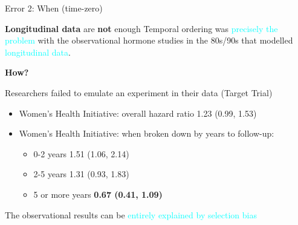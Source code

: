 \documentclass[
  ignorenonframetext,
  aspectratio=169,
]{beamer}
\providecommand{\tightlist}{%
  \setlength{\itemsep}{0pt}\setlength{\parskip}{0pt}}
\begin{document}
\begin{frame}{Error 2: When (time-zero)}
\label{error-2-when-time-zero}
\begin{block}{\textbf{Longitudinal data} are \textbf{not} enough}
\label{longitudinal-data-are-not-enough}
Temporal ordering was \textcolor{cyan}{precisely the problem} with the
observational hormone studies in the 80s/90s that modelled
\textcolor{cyan}{longitudinal data}.

\textbf{How?}
\end{block}

\begin{block}{Researchers failed to emulate an experiment in their data
(Target Trial)}
\label{researchers-failed-to-emulate-an-experiment-in-their-data-target-trial}
\begin{itemize}
\item
  Women's Health Initiative: overall hazard ratio 1.23 (0.99, 1.53)
\item
  Women's Health Initiative: when broken down by years to follow-up:

  \begin{itemize}
  \tightlist
  \item
    0-2 years 1.51 (1.06, 2.14)
  \item
    2-5 years 1.31 (0.93, 1.83)
  \item
    5 or more years \textbf{0.67 (0.41, 1.09)}
  \end{itemize}
\end{itemize}

\begin{tcolorbox}[enhanced jigsaw, toprule=.15mm, leftrule=.75mm, bottomtitle=1mm, colbacktitle=quarto-callout-note-color!10!white, rightrule=.15mm, bottomrule=.15mm, left=2mm, breakable, coltitle=black, arc=.35mm, toptitle=1mm, title={Survivor Bias.}, colback=white, opacityback=0, titlerule=0mm, opacitybacktitle=0.6, colframe=quarto-callout-note-color-frame]

The observational results can be
\textcolor{cyan}{entirely explained by selection bias}

\end{tcolorbox}

\begin{tcolorbox}[enhanced jigsaw, toprule=.15mm, leftrule=.75mm, bottomtitle=1mm, colbacktitle=quarto-callout-note-color!10!white, rightrule=.15mm, bottomrule=.15mm, left=2mm, breakable, coltitle=black, arc=.35mm, toptitle=1mm, title={Emulating a target trial with observational data recovers experimental
effects.}, colback=white, opacityback=0, titlerule=0mm, opacitybacktitle=0.6, colframe=quarto-callout-note-color-frame]


\end{tcolorbox}
\end{block}
\end{frame}
\end{document}
